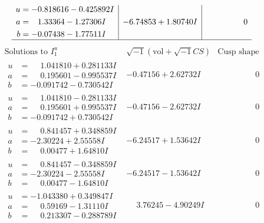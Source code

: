 \documentclass[1p]{elsarticle_modified}
\theoremstyle{definition}
\newcommand{\I}{\sqrt{-1}}
\begin{document}
$$\begin{array}{c|c|c}
\begin{aligned}
u &= -0.818616 - 0.425892 I \\
a &= \phantom{-}1.33364 - 1.27306 I \\
b &= -0.07438 - 1.77511 I\end{aligned}
 & -6.74853 + 1.80740 I & \phantom{-0.000000 } 0\\
 \hline 
 \end{array}$$\newpage$$\begin{array}{c|c|c}  
\text{Solutions to }I^u_{1}& \I (\text{vol} + \sqrt{-1}CS) & \text{Cusp shape}\\
 \hline 
\begin{aligned}
u &= \phantom{-}1.041810 + 0.281133 I \\
a &= \phantom{-}0.195601 - 0.995537 I \\
b &= -0.091742 - 0.730542 I\end{aligned}
 & -0.47156 + 2.62732 I & \phantom{-0.000000 } 0 \\ \hline\begin{aligned}
u &= \phantom{-}1.041810 - 0.281133 I \\
a &= \phantom{-}0.195601 + 0.995537 I \\
b &= -0.091742 + 0.730542 I\end{aligned}
 & -0.47156 - 2.62732 I & \phantom{-0.000000 } 0 \\ \hline\begin{aligned}
u &= \phantom{-}0.841457 + 0.348859 I \\
a &= -2.30224 + 2.55558 I \\
b &= \phantom{-}0.00477 + 1.64810 I\end{aligned}
 & -6.24517 + 1.53642 I & \phantom{-0.000000 } 0 \\ \hline\begin{aligned}
u &= \phantom{-}0.841457 - 0.348859 I \\
a &= -2.30224 - 2.55558 I \\
b &= \phantom{-}0.00477 - 1.64810 I\end{aligned}
 & -6.24517 - 1.53642 I & \phantom{-0.000000 } 0 \\ \hline\begin{aligned}
u &= -1.043380 + 0.349847 I \\
a &= \phantom{-}0.59169 - 1.31110 I \\
b &= \phantom{-}0.213307 - 0.288789 I\end{aligned}
 & \phantom{-}3.76245 - 4.90249 I & \phantom{-0.000000 } 0 \\ \hline\begin{aligned}

\end{aligned}
\end{array}$$
\end{document}
